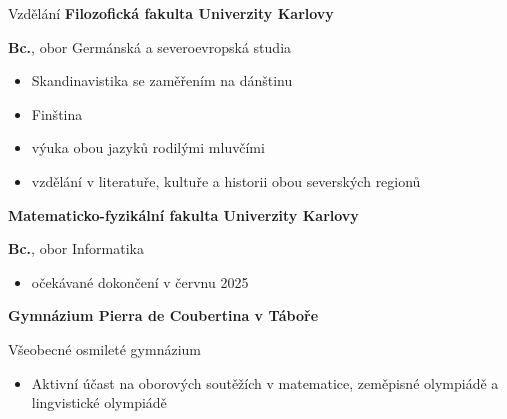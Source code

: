 \documentclass[11pt, a4paper]{article}
\newenvironment{highlights}{
    \begin{itemize}[
        topsep=0.08 cm,
        parsep=0.05 cm,
        partopsep=0pt,
        itemsep=0pt,
        leftmargin=0.5 cm
    ]
}{
    \end{itemize}
} %
\begin{document}
    \begin{mysection}{Vzdělání}
        \textbf{Filozofická fakulta Univerzity Karlovy}

        \textbf{Bc.}, obor Germánská a severoevropská studia
        \begin{itemize}[
            topsep=0pt,
            parsep=0pt,
            partopsep=0pt,
            itemsep=0pt,
            label={}
        ]
            \item Skandinavistika se zaměřením na dánštinu
            \item Finština
        \end{itemize}

        \begin{highlights}
            \item výuka obou jazyků rodilými mluvčími
            \item vzdělání v literatuře, kultuře a historii obou severských regionů
        \end{highlights}

        \vspace{0.4 cm}

        \textbf{Matematicko-fyzikální fakulta Univerzity Karlovy}

        \textbf{Bc.}, obor Informatika

        \begin{highlights}
            \item očekávané dokončení v červnu 2025
        \end{highlights}

        \vspace{0.4 cm}

        \textbf{Gymnázium Pierra de Coubertina v Táboře}

        Všeobecné osmileté gymnázium

        \begin{highlights}
            \item Aktivní účast na oborových soutěžích v matematice, zeměpisné olympiádě a lingvistické olympiádě
        \end{highlights}
    \end{mysection}
\end{document}
